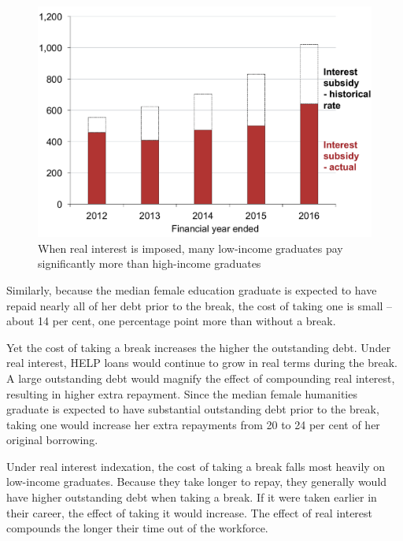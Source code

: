 \documentclass[embargoed]{grattan}
\begin{document}
\begin{figure}
\caption{When real interest is imposed, many low-income graduates pay significantly more than high-income graduates}\label{fig:fig14-when-real-interest-imposed-many-low-income-grads-pay-signif-more-than-high-income-grads}


\includegraphics[page=14]{atlas/Chartpack.pdf}

%
\end{figure}

Similarly, because the median female education graduate is expected to have repaid nearly all of her debt prior to the break, the cost of taking one is small -- about 14 per cent, one percentage point more than without a break.

Yet the cost of taking a break increases the higher the outstanding debt.
Under real interest, HELP loans would continue to grow in real terms during the break.
A large outstanding debt would magnify the effect of compounding real interest, resulting in higher extra repayment.
Since the median female humanities graduate is expected to have substantial outstanding debt prior to the break, taking one would increase her extra repayments from 20 to 24 per cent of her original borrowing.

Under real interest indexation, the cost of taking a break falls most heavily on low-income graduates.
Because they take longer to repay, they generally would have higher outstanding debt when taking a break.
If it were taken earlier in their career, the effect of taking it would increase.
The effect of real interest compounds the longer their time out of the workforce.
\end{document}

